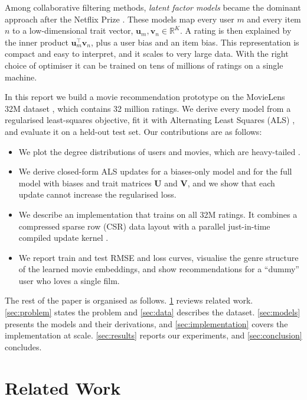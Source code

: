 \documentclass{article}
\theoremstyle{plain}
\theoremstyle{definition}
\theoremstyle{remark}
\begin{document}
Among collaborative filtering methods, \emph{latent factor models} became the
dominant approach after the Netflix Prize \cite{bennett2007netflix,
koren2009matrix}. These models map every user $m$ and every item $n$ to a
low-dimensional trait vector, $\mathbf{u}_m, \mathbf{v}_n \in \mathbb{R}^K$.
A rating is then explained by the inner product $\mathbf{u}_m^\top
\mathbf{v}_n$, plus a user bias and an item bias. This representation is
compact and easy to interpret, and it scales to very large data. With the
right choice of optimiser it can be trained on tens of millions of ratings on
a single machine.

In this report we build a movie recommendation prototype on the MovieLens
32M dataset \cite{harper2015movielens}, which contains 32 million ratings.
We derive every model from a regularised least-squares objective, fit it
with Alternating Least Squares (ALS) \cite{zhou2008large,
hu2008collaborative}, and evaluate it on a held-out test set. Our
contributions are as follows:
\begin{itemize}
  \item We plot the degree distributions of users and movies, which are
        heavy-tailed \cite{clauset2009power}.
  \item We derive closed-form ALS updates for a biases-only model and for the
        full model with biases and trait matrices $\mathbf{U}$ and
        $\mathbf{V}$, and we show that each update cannot increase the
        regularised loss.
  \item We describe an implementation that trains on all 32M ratings. It
        combines a compressed sparse row (CSR) data layout with a parallel
        just-in-time compiled update kernel \cite{lam2015numba}.
  \item We report train and test RMSE and loss curves, visualise the genre
        structure of the learned movie embeddings, and show recommendations
        for a ``dummy'' user who loves a single film.
\end{itemize}

The rest of the paper is organised as follows. \cref{sec:related} reviews
related work. \cref{sec:problem} states the problem and \cref{sec:data}
describes the dataset. \cref{sec:models} presents the models and their
derivations, and \cref{sec:implementation} covers the implementation at
scale. \cref{sec:results} reports our experiments, and
\cref{sec:conclusion} concludes.

\section{Related Work}
\label{sec:related}
\end{document}
